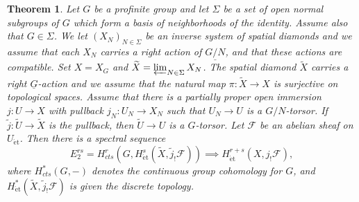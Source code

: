 \documentclass{amsart}
\newtheorem{thm}[subsubsection]{Theorem}
\theoremstyle{remark}
\numberwithin{equation}{subsection}
\newcommand{\cF}{{\mathcal F}}
\newcommand{\et}{\mathrm{\acute{e}t}}
\newcommand{\ul}{\underline}
\newcommand{\wt}{\widetilde}
\renewcommand{\(}{\left(}
\renewcommand{\)}{\right)}
\begin{document}
\begin{thm}\label{hochschildserre}
Let $G$ be a profinite group and let $\Sigma$ be a set of open normal subgroups of $G$ which form a basis of neighborhoods of the identity. Assume also that $G\in \Sigma$. We let $(X_{N})_{N\in \Sigma}$ be an inverse system of spatial diamonds and we assume that each $X_{N}$ carries a right action of $\ul{G/N}$, and that these actions are compatible. Set $X=X_{G}$ and $\wt{X}=\varprojlim_{N\in \Sigma}X_{N}$.
The spatial diamond $\wt{X}$ carries a right $\ul{G}$-action and we assume that the natural map $\pi \colon \wt{X} \to X$ is surjective on topological spaces. Assume that there is a partially proper open immersion $j \colon U \to X$ with pullback $j_{N} \colon U_{N} \to X_{N}$ such that $U_{N} \to U$ is a $G/N$-torsor. If $\wt{j} \colon \wt{U} \to \wt{X} $ is the pullback, then $\wt{U} \to U$ is a $G$-torsor. Let $\cF$ be an abelian sheaf on $U_{\et}$. Then there is a spectral sequence
$$ E_{2}^{rs}=H^{r}_{cts}(G,H^{s}_{\et}(\wt{X},\wt{j}_{!}\cF)) \implies H^{r+s}_{\et}(X,j_{!}\cF), $$
where $H^{\ast}_{cts}(G,-)$ denotes the continuous group cohomology for $G$, and $H^{\ast}_{\et}(\wt{X},\wt{j}_{!}\cF)$ is given the discrete topology.
\end{thm}
\end{document}
